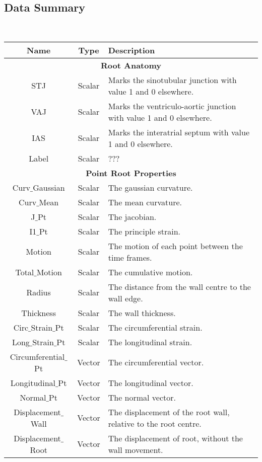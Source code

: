 \documentclass{article}
\begin{document}
\subsection*{Data Summary}
~
\begin{tabular}{|c|c|l|}
	\hline
\textbf{Name}	& \textbf{Type} & \textbf{Description}   \\
	\hline
	\hline
	\multicolumn{3}{|c|}{\textbf{Root Anatomy}} \\
	\hline
STJ	& Scalar  & Marks the sinotubular junction with value 1 and 0 elsewhere.  \\
	\hline
VAJ	& Scalar &  Marks the ventriculo-aortic junction with value 1 and 0 elsewhere.  \\
	\hline 
IAS	&Scalar &Marks the interatrial septum with value 1 and 0 elsewhere. \\
	\hline
Label	& Scalar & ???\\
\hline
\hline
\multicolumn{3}{|c|}{\textbf{Point Root Properties}} \\
	\hline
Curv$\_$Gaussian	& Scalar& The gaussian curvature.\\
\hline
Curv$\_$Mean	& Scalar& The mean curvature.\\
	\hline
J$\_$Pt	& Scalar& The jacobian.\\
	\hline
I1$\_$Pt& Scalar & The principle strain. \\
	\hline
Motion	& Scalar& The motion of each point between the time frames.\\
	\hline
Total$\_$Motion	& Scalar& The cumulative motion. \\
	\hline
Radius	&Scalar & The distance from the wall centre to the wall edge.\\
\hline
Thickness	&Scalar & The wall thickness.\\
	\hline
Circ$\_$Strain$\_$Pt	& Scalar & The circumferential strain.\\
\hline
Long$\_$Strain$\_$Pt	& Scalar & The longitudinal strain.\\
	\hline
Circumferential$\_$Pt	& Vector &The circumferential vector. \\
	\hline
Longitudinal$\_$Pt	&Vector & The longitudinal vector.\\
	\hline
Normal$\_$Pt	&Vector & The normal vector.\\
	\hline
Displacement$\_$Wall & Vector & The displacement of the root wall, relative to the root centre. \\
	\hline
Displacement$\_$Root  &  Vector& The displacement of root, without the wall movement. \\

\end{tabular}
\end{document}
